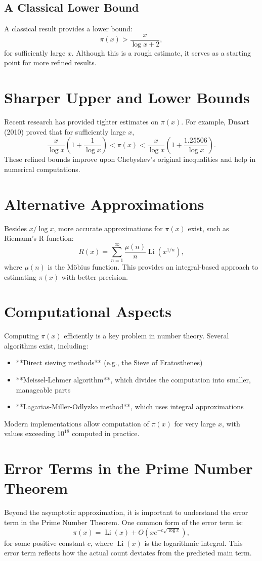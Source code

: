 \subsection{A Classical Lower Bound}
A classical result provides a lower bound:
\[
\pi(x) > \frac{x}{\log x + 2},
\]
for sufficiently large $x$. Although this is a rough estimate, it serves as a starting point for more refined results.

\section{Sharper Upper and Lower Bounds}
Recent research has provided tighter estimates on $\pi(x)$. For example, Dusart (2010) proved that for sufficiently large $x$,
\[
\frac{x}{\log x} \left(1 + \frac{1}{\log x}\right) < \pi(x) < \frac{x}{\log x} \left(1 + \frac{1.25506}{\log x}\right).
\]
These refined bounds improve upon Chebyshev's original inequalities and help in numerical computations.

\section{Alternative Approximations}
Besides $x/\log x$, more accurate approximations for $\pi(x)$ exist, such as Riemann’s R-function:
\[
R(x) = \sum_{n=1}^{\infty} \frac{\mu(n)}{n} \operatorname{Li}(x^{1/n}),
\]
where $\mu(n)$ is the Möbius function. This provides an integral-based approach to estimating $\pi(x)$ with better precision.

\section{Computational Aspects}
Computing $\pi(x)$ efficiently is a key problem in number theory. Several algorithms exist, including:
\begin{itemize}
    \item **Direct sieving methods** (e.g., the Sieve of Eratosthenes)
    \item **Meissel-Lehmer algorithm**, which divides the computation into smaller, manageable parts
    \item **Lagarias-Miller-Odlyzko method**, which uses integral approximations
\end{itemize}
Modern implementations allow computation of $\pi(x)$ for very large $x$, with values exceeding $10^{18}$ computed in practice.

\section{Error Terms in the Prime Number Theorem}
Beyond the asymptotic approximation, it is important to understand the error term in the Prime Number Theorem. One common form of the error term is:
\[
\pi(x) = \operatorname{Li}(x) + O\left(x e^{-c\sqrt{\log x}}\right),
\]
for some positive constant \(c\), where $\operatorname{Li}(x)$ is the logarithmic integral. This error term reflects how the actual count deviates from the predicted main term.

